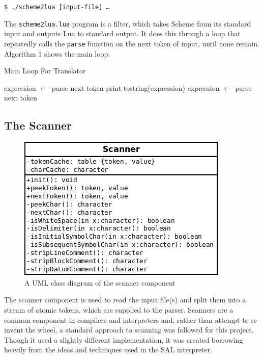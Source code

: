 \begin{framed}
\texttt{\$ ./scheme2lua [input-file] \ldots}
\end{framed}

The \texttt{scheme2lua.lua} program is a filter, which takes Scheme from its
standard input and outputs Lua to standard output. It does this through a loop
that repeatedly calls the \texttt{parse} function on the next token of input,
until none remain. Algorithm 1 shows the main loop:

\begin{algorithm}
\caption{Main Loop For Translator}
\label{alg:mainloop}
\begin{algorithmic}
\STATE expression $\leftarrow$ parse next token  
\STATE print tostring(expression)
\STATE expression $\leftarrow$ parse next token
\ENDWHILE
\end{algorithmic}
\end{algorithm}

\subsection{The Scanner}

\begin{figure}
\centering
\includegraphics[width=\textwidth]{scannerUML.png}
\caption{A UML class diagram of the scanner component}
\label{fig:scannerUML}
\end{figure}

The scanner component is used to read the input file(s) and split them into a
stream of atomic tokens, which are supplied to the parser. Scanners are a common
component in compilers and interpreters and, rather than attempt to re-invent
the wheel, a standard approach to scanning was followed for this project.
Though it used a slightly different implementation, it was created borrowing
heavily from the ideas and techniques used in the SAL interpreter\cite{sal}.


